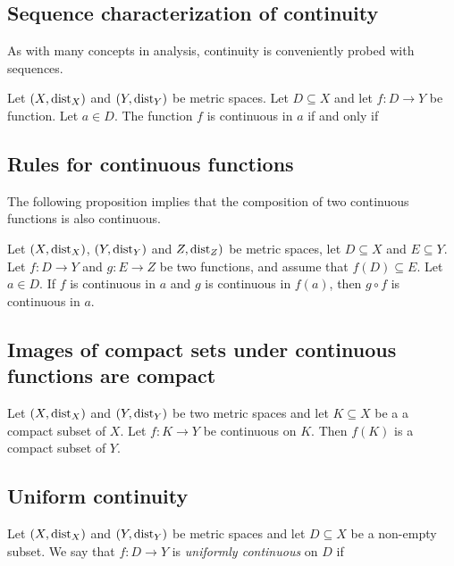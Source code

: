 \subsection{Sequence characterization of continuity}
As with many concepts in analysis, continuity is conveniently probed with sequences.

\begin{theorem}
    Let $(X, \text{dist}_X)$ and $(Y, \text{dist}_Y)$ be metric spaces. Let $D \subseteq X$ and let $f: D \to Y$ be function.
    Let $a \in D$. The function $f$ is continuous in $a$ if and only if
    \begin{myCenter}
    \end{myCenter}
\end{theorem}

\subsection{Rules for continuous functions}
The following proposition implies that the composition of two continuous functions is also continuous.
\begin{proposition}
    Let $(X, \text{dist}_X)$, $(Y, \text{dist}_Y)$ and $Z, \text{dist}_Z)$ be metric spaces, let $D \subseteq X$ and $E \subseteq Y$.
    Let $f: D \to Y$ and $g: E \to Z$ be two functions, and assume that $f(D) \subseteq E$. Let $a \in D$. If $f$ is
    continuous in $a$ and $g$ is continuous in $f(a)$, then $g \circ f$ is continuous in $a$.
\end{proposition}

\subsection{Images of compact sets under continuous functions are compact}
\begin{proposition}
    Let $(X, \text{dist}_X)$ and $(Y, \text{dist}_Y)$ be two metric spaces and let $K \subseteq X$ be a a compact subset of $X$.
    Let $f: K \to Y$ be continuous on $K$. Then $f(K)$ is a compact subset of $Y$.
\end{proposition}

\subsection{Uniform continuity}
\begin{definition}
    Let $(X, \text{dist}_X)$ and $(Y, \text{dist}_Y)$ be metric spaces and let $D \subseteq X$ be a non-empty subset. We say
    that $f: D \to Y$ is \emph{uniformly continuous} on $D$ if
    \begin{myCenter}
    \end{myCenter}
\end{definition}

